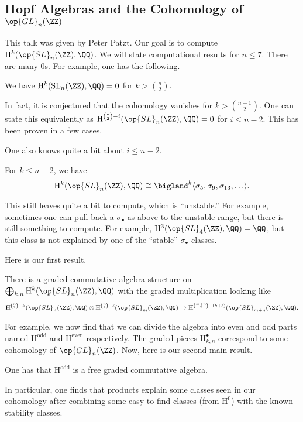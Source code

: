 \documentclass{article}
\begin{document}
\subsection{Hopf Algebras and the Cohomology of \texorpdfstring{$\op{GL}_n(\ZZ)$}{GLn(Z)}}
This talk was given by Peter Patzt. Our goal is to compute $\mathrm H^k(\op{SL}_n(\ZZ),\QQ)$. We will state computational results for $n\le 7$. There are many $0$s. For example, one has the following.
\begin{theorem}
	We have $\mathrm H^k(\mathrm{SL}_n(\ZZ),\QQ)=0$ for $k>\binom n2$.
\end{theorem}
In fact, it is conjectured that the cohomology vanishes for $k>\binom{n-1}2$. One can state this equivalently as $\mathrm H^{\binom n2-i}(\op{SL}_n(\ZZ),\QQ)=0$ for $i\le n-2$. This has been proven in a few cases.

One also knows quite a bit about $i\le n-2$.
\begin{theorem}[Borel]
	For $k\le n-2$, we have
	\[\mathrm H^k(\op{SL}_n(\ZZ),\QQ)\cong\bigland^k\langle\sigma_5,\sigma_9,\sigma_{13},\ldots\rangle.\]
\end{theorem}
This still leaves quite a bit to compute, which is ``unstable.'' For example, sometimes one can pull back a $\sigma_\bullet$ as above to the unstable range, but there is still something to compute. For example, $\mathrm H^3(\op{SL}_4(\ZZ),\QQ)=\QQ$, but this class is not explained by one of the ``stable'' $\sigma_\bullet$ classes.

Here is our first result.
\begin{theorem}
	There is a graded commutative algebra structure on $\bigoplus_{k,n}\mathrm H^k(\op{SL}_n(\ZZ),\QQ)$ with the graded multiplication looking like
	\[\mathrm H^{\binom n2-k}(\op{SL}_n(\ZZ),\QQ)\otimes\mathrm H^{\binom n2-\ell}(\op{SL}_m(\ZZ),\QQ)\to\mathrm H^{\binom {m+n}2-(k+\ell)}(\op{SL}_{m+n}(\ZZ),\QQ).\]
\end{theorem}
For example, we now find that we can divide the algebra into even and odd parts named $\mathrm H^{\mathrm{odd}}$ and $\mathrm H^{\mathrm{even}}$ respectively. The graded pieces $\mathrm H^\bullet_{k,n}$ correspond to some cohomology of $\op{GL}_n(\ZZ)$. Now, here is our second main result.
\begin{theorem}
	One has that $\mathrm H^{\mathrm{odd}}$ is a free graded commutative algebra.
\end{theorem}
In particular, one finds that products explain some classes seen in our cohomology after combining some easy-to-find classes (from $\mathrm H^0$) with the known stability classes.
\end{document}
